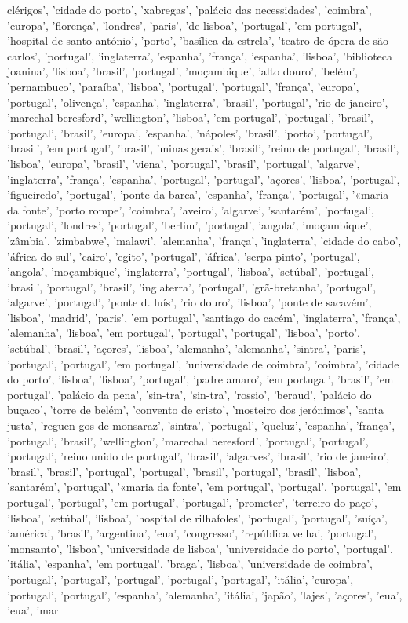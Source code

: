 \documentclass{article}
\begin{document}
\begin{itemize}
clérigos', 'cidade do porto', 'xabregas', 'palácio das necessidades', 'coimbra', 'europa', 'florença', 'londres', 'paris', 'de lisboa', 'portugal', 'em portugal', 'hospital de santo antónio', 'porto', 'basílica da estrela', 'teatro de ópera de são carlos', 'portugal', 'inglaterra', 'espanha', 'frança', 'espanha', 'lisboa', 'biblioteca joanina', 'lisboa', 'brasil', 'portugal', 'moçambique', 'alto douro', 'belém', 'pernambuco', 'paraíba', 'lisboa', 'portugal', 'portugal', 'frança', 'europa', 'portugal', 'olivença', 'espanha', 'inglaterra', 'brasil', 'portugal', 'rio de janeiro', 'marechal beresford', 'wellington', 'lisboa', 'em portugal', 'portugal', 'brasil', 'portugal', 'brasil', 'europa', 'espanha', 'nápoles', 'brasil', 'porto', 'portugal', 'brasil', 'em portugal', 'brasil', 'minas gerais', 'brasil', 'reino de portugal', 'brasil', 'lisboa', 'europa', 'brasil', 'viena', 'portugal', 'brasil', 'portugal', 'algarve', 'inglaterra', 'frança', 'espanha', 'portugal', 'portugal', 'açores', 'lisboa', 'portugal', 'figueiredo', 'portugal', 'ponte da barca', 'espanha', 'frança', 'portugal', '«maria da fonte', 'porto rompe', 'coimbra', 'aveiro', 'algarve', 'santarém', 'portugal', 'portugal', 'londres', 'portugal', 'berlim', 'portugal', 'angola', 'moçambique', 'zâmbia', 'zimbabwe', 'malawi', 'alemanha', 'frança', 'inglaterra', 'cidade do cabo', 'áfrica do sul', 'cairo', 'egito', 'portugal', 'áfrica', 'serpa pinto', 'portugal', 'angola', 'moçambique', 'inglaterra', 'portugal', 'lisboa', 'setúbal', 'portugal', 'brasil', 'portugal', 'brasil', 'inglaterra', 'portugal', 'grã-bretanha', 'portugal', 'algarve', 'portugal', 'ponte d. luís', 'rio douro', 'lisboa', 'ponte de sacavém', 'lisboa', 'madrid', 'paris', 'em portugal', 'santiago do cacém', 'inglaterra', 'frança', 'alemanha', 'lisboa', 'em portugal', 'portugal', 'portugal', 'lisboa', 'porto', 'setúbal', 'brasil', 'açores', 'lisboa', 'alemanha', 'alemanha', 'sintra', 'paris', 'portugal', 'portugal', 'em portugal', 'universidade de coimbra', 'coimbra', 'cidade do porto', 'lisboa', 'lisboa', 'portugal', 'padre amaro', 'em portugal', 'brasil', 'em portugal', 'palácio da pena', 'sin-tra', 'sin-tra', 'rossio', 'beraud', 'palácio do buçaco', 'torre de belém', 'convento de cristo', 'mosteiro dos jerónimos', 'santa justa', 'reguen-gos de monsaraz', 'sintra', 'portugal', 'queluz', 'espanha', 'frança', 'portugal', 'brasil', 'wellington', 'marechal beresford', 'portugal', 'portugal', 'portugal', 'reino unido de portugal', 'brasil', 'algarves', 'brasil', 'rio de janeiro', 'brasil', 'brasil', 'portugal', 'portugal', 'brasil', 'portugal', 'brasil', 'lisboa', 'santarém', 'portugal', '«maria da fonte', 'em portugal', 'portugal', 'portugal', 'em portugal', 'portugal', 'em portugal', 'portugal', 'prometer', 'terreiro do paço', 'lisboa', 'setúbal', 'lisboa', 'hospital de rilhafoles', 'portugal', 'portugal', 'suíça', 'américa', 'brasil', 'argentina', 'eua', 'congresso', 'república velha', 'portugal', 'monsanto', 'lisboa', 'universidade de lisboa', 'universidade do porto', 'portugal', 'itália', 'espanha', 'em portugal', 'braga', 'lisboa', 'universidade de coimbra', 'portugal', 'portugal', 'portugal', 'portugal', 'portugal', 'itália', 'europa', 'portugal', 'portugal', 'espanha', 'alemanha', 'itália', 'japão', 'lajes', 'açores', 'eua', 'eua', 'mar 
\end{itemize}
\end{document}
